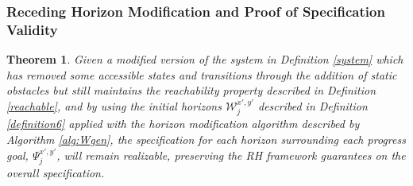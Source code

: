 \documentclass{ieeeaccess}
\newtheorem{theorem}{Theorem}
\begin{document}
\subsubsection{Receding Horizon Modification and Proof of Specification Validity}

\begin{theorem}
	Given a modified version of the system in Definition \ref{system} which has removed some accessible states and transitions through the addition of static obstacles but still maintains the \textit{reachability} property described in Definition \ref{reachable}, and by using the initial horizons $\mathcal{W}^{x',y'}_j$ described in Definition \ref{definition6} applied with the horizon modification algorithm described by Algorithm \ref{alg:Wgen}, the specification for each horizon surrounding each progress goal, $\Psi_{j}^{x',y'}$, will remain realizable, preserving the RH framework guarantees on the overall specification.
\end{theorem}
\end{document}
